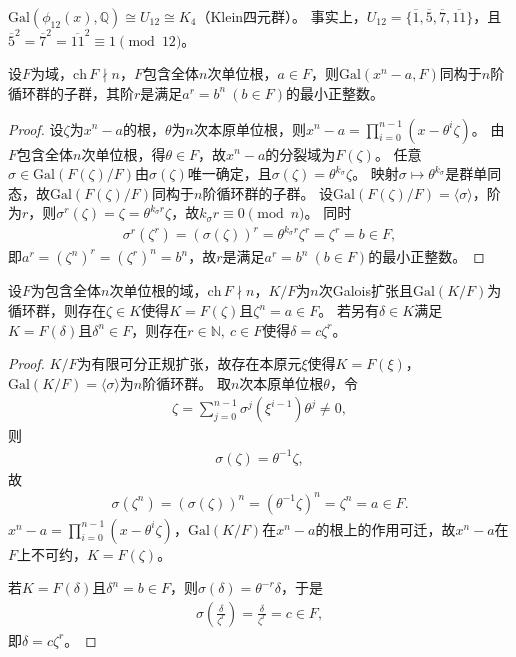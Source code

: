 \documentclass[../../main.tex]{subfiles}%
\begin{document}
\begin{example}
$\mathrm{Gal}(\phi_{12}(x),\mathbb{Q})\cong U_{12}\cong K_4$（Klein四元群）。
事实上，$U_{12}=\{\overline{1},\overline{5},\overline{7},\overline{11}\}$，且$\overline{5}^2=\overline{7}^2=\overline{11}^2\equiv1\pmod{12}$。
\end{example}

\begin{theorem}
设$F$为域，$\mathrm{ch}\,F\nmid n$，$F$包含全体$n$次单位根，$a\in F$，则$\mathrm{Gal}(x^n-a,F)$同构于$n$阶循环群的子群，其阶$r$是满足$a^r=b^n\ (b\in F)$的最小正整数。
\end{theorem}
\begin{proof}
设$\zeta$为$x^n-a$的根，$\theta$为$n$次本原单位根，则$x^n-a=\prod\limits_{i=0}^{n-1}(x-\theta^i\zeta)$。
由$F$包含全体$n$次单位根，得$\theta\in F$，故$x^n-a$的分裂域为$F(\zeta)$。
任意$\sigma\in\mathrm{Gal}(F(\zeta)/F)$由$\sigma(\zeta)$唯一确定，且$\sigma(\zeta)=\theta^{k_\sigma}\zeta$。
映射$\sigma\mapsto\theta^{k_\sigma}$是群单同态，故$\mathrm{Gal}(F(\zeta)/F)$同构于$n$阶循环群的子群。
设$\mathrm{Gal}(F(\zeta)/F)=\langle\sigma\rangle$，阶为$r$，则$\sigma^r(\zeta)=\zeta=\theta^{k_\sigma r}\zeta$，故$k_\sigma r\equiv0\pmod{n}$。
同时
\begin{align*}
\sigma^r(\zeta^r)=(\sigma(\zeta))^r=\theta^{k_\sigma r}\zeta^r=\zeta^r=b\in F,
\end{align*}
即$a^r=(\zeta^n)^r=(\zeta^r)^n=b^n$，故$r$是满足$a^r=b^n\ (b\in F)$的最小正整数。
\end{proof}

\begin{theorem}
设$F$为包含全体$n$次单位根的域，$\mathrm{ch}\,F\nmid n$，$K/F$为$n$次Galois扩张且$\mathrm{Gal}(K/F)$为循环群，则存在$\zeta\in K$使得$K=F(\zeta)$且$\zeta^n=a\in F$。
若另有$\delta\in K$满足$K=F(\delta)$且$\delta^n\in F$，则存在$r\in\mathbb{N},\ c\in F$使得$\delta=c\zeta^r$。
\end{theorem}
\begin{proof}
$K/F$为有限可分正规扩张，故存在本原元$\xi$使得$K=F(\xi)$，$\mathrm{Gal}(K/F)=\langle\sigma\rangle$为$n$阶循环群。
取$n$次本原单位根$\theta$，令
\begin{align*}
\zeta=\sum\limits_{j=0}^{n-1}\sigma^j(\xi^{i-1})\theta^j\neq0,
\end{align*}
则
\begin{align*}
\sigma(\zeta)=\theta^{-1}\zeta,
\end{align*}
故
\begin{align*}
\sigma(\zeta^n)=(\sigma(\zeta))^n=(\theta^{-1}\zeta)^n=\zeta^n=a\in F.
\end{align*}
$x^n-a=\prod\limits_{i=0}^{n-1}(x-\theta^i\zeta)$，$\mathrm{Gal}(K/F)$在$x^n-a$的根上的作用可迁，故$x^n-a$在$F$上不可约，$K=F(\zeta)$。

若$K=F(\delta)$且$\delta^n=b\in F$，则$\sigma(\delta)=\theta^{-r}\delta$，于是
\begin{align*}
\sigma\left(\frac{\delta}{\zeta^r}\right)=\frac{\delta}{\zeta^r}=c\in F,
\end{align*}
即$\delta=c\zeta^r$。
\end{proof}
\end{document}
